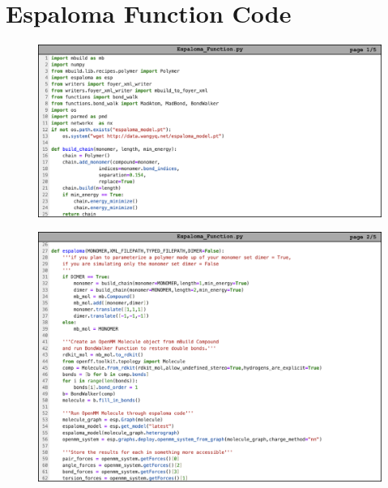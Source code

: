 \chapter{Espaloma Function Code}
\label{app:esp_function_code}

\begin{figure}
    \centering
    \includegraphics[width=1\linewidth]{src/figures/FF_figs/esp1.png}
    \label{fig:esp1}
\end{figure}

\begin{figure}
    \centering
    \includegraphics[width=1\linewidth]{src/figures/FF_figs/esp2.png}
    \label{fig:esp2}
\end{figure}

